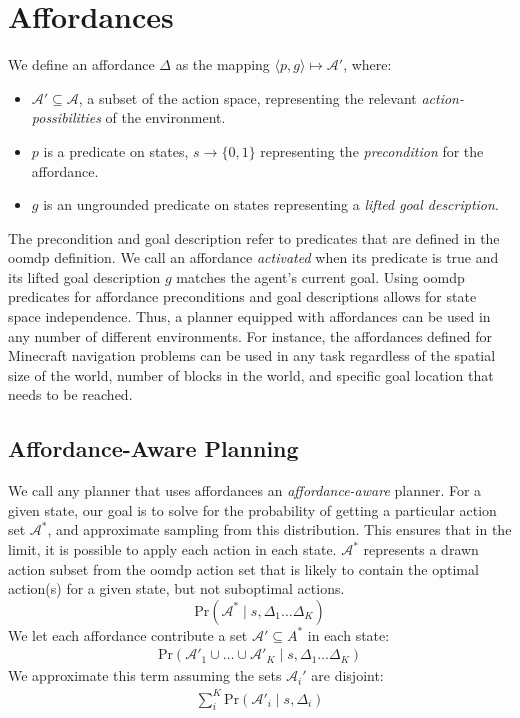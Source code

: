 \documentclass[letterpaper]{article}
\begin{document}
\section{Affordances}
\label{sec:affordances}

We define an affordance $\Delta$ 
as the mapping $\langle p,g\rangle \longmapsto \mathcal{A}'$,
where:
\begin{itemize}
\item[] $\mathcal{A}' \subseteq \mathcal{A}$, a subset of the action space, representing the relevant {\it action-possibilities} of the environment.
\item[] $p$ is a predicate on states, $s \longrightarrow \{$0$, 1\}$
  representing the {\em precondition} for the affordance.
\item[] $g$ is an ungrounded predicate on states representing a {\it lifted goal description}.
\end{itemize}
The precondition and goal description refer to predicates that are defined in the \gls{oomdp} definition.
We call an affordance {\it activated} when its predicate is true and its lifted goal description $g$ matches the agent's current goal. 
Using \gls{oomdp} predicates for affordance preconditions and goal descriptions 
allows for state space independence. Thus, a planner equipped with
affordances can be used in any number of different environments. For instance, the affordances defined for Minecraft 
navigation problems can be used in any task regardless of the spatial size of the world, 
number of blocks in the world, and specific goal location that needs to be reached.

\subsection{Affordance-Aware Planning}
We call any planner that
uses affordances an {\it affordance-aware} planner. For a given state, 
our goal is to solve for the probability of getting a particular action set $\mathcal{A}^*$, and approximate sampling
from this distribution. This ensures that in the limit, it is possible to apply each action in each state. $\mathcal{A}^*$ represents
a drawn action subset from the \gls{oomdp} action set that is likely to contain the optimal action(s) for a given state,
but not suboptimal actions.
\begin{equation}
\text{Pr}(\mathcal{A}^* \mid s, \Delta_1 \dots \Delta_K)
\end{equation}
We let each affordance contribute a set $\mathcal{A}' \subseteq A^*$ in each state:
\begin{align}
\text{Pr}(\mathcal{A}'_1 \cup \ldots \cup \mathcal{A}'_K \mid s, \Delta_1 \dots \Delta_K)
\end{align}
We approximate this term assuming the sets $\mathcal{A}_i'$ are disjoint:
\begin{align}
\sum_i^K \text{Pr}(\mathcal{A}'_i \mid s, \Delta_i)
\end{align}
\end{document}
